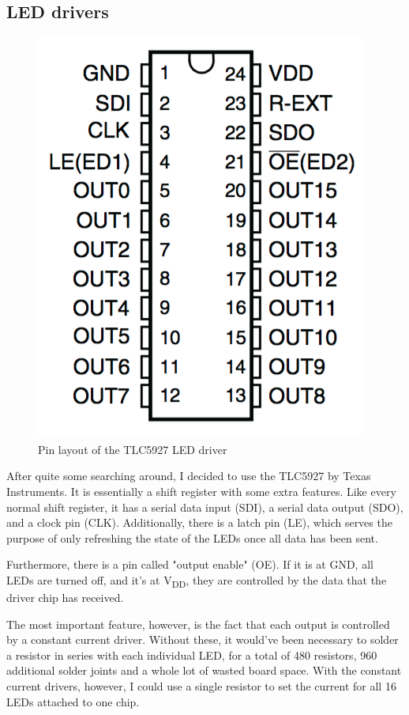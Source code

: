 \documentclass[a4paper, 11pt, titlepage]{report}
\def \vdd {V\textsubscript{DD}}
\begin{document}
\newpage
\subsection{LED drivers}


\begin{figure}

\includegraphics[scale=0.35]{./images/tlc-pins.png}
\caption{Pin layout of the TLC5927 LED driver}

\end{figure}

After quite some searching around, I decided to use the TLC5927 by Texas Instruments. It is
essentially a shift register with some extra features. Like every normal shift register, it has a
serial data input (SDI), a serial data output (SDO), and a clock pin (CLK). Additionally, there is
a latch pin (LE), which serves the purpose of only refreshing the state of the LEDs once all data
has been sent.

Furthermore, there is a pin called "output enable" (OE). If it is at GND, all LEDs are turned off,
and it's at \vdd, they are controlled by the data that the driver chip has received.

The most important feature, however, is the fact that each output is controlled by a constant
current driver. Without these, it would've been necessary to solder a resistor in series
with each individual LED, for a total of 480 resistors, 960 additional solder joints and a whole
lot of wasted board space. With the constant current drivers, however, I could use a single
resistor to set the current for all 16 LEDs attached to one chip.
\end{document}
